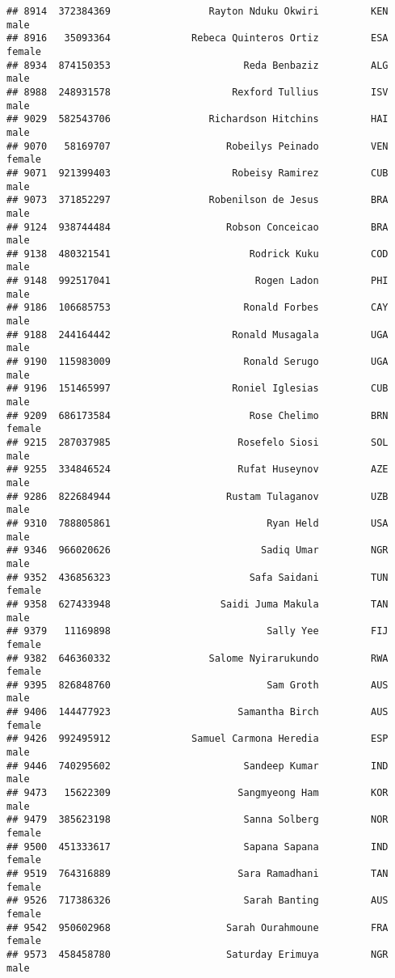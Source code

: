 \documentclass[]{article}
\begin{document}
\begin{verbatim}
## 8914  372384369                 Rayton Nduku Okwiri         KEN   male
## 8916   35093364              Rebeca Quinteros Ortiz         ESA female
## 8934  874150353                       Reda Benbaziz         ALG   male
## 8988  248931578                     Rexford Tullius         ISV   male
## 9029  582543706                 Richardson Hitchins         HAI   male
## 9070   58169707                    Robeilys Peinado         VEN female
## 9071  921399403                     Robeisy Ramirez         CUB   male
## 9073  371852297                 Robenilson de Jesus         BRA   male
## 9124  938744484                    Robson Conceicao         BRA   male
## 9138  480321541                        Rodrick Kuku         COD   male
## 9148  992517041                         Rogen Ladon         PHI   male
## 9186  106685753                       Ronald Forbes         CAY   male
## 9188  244164442                     Ronald Musagala         UGA   male
## 9190  115983009                       Ronald Serugo         UGA   male
## 9196  151465997                     Roniel Iglesias         CUB   male
## 9209  686173584                        Rose Chelimo         BRN female
## 9215  287037985                      Rosefelo Siosi         SOL   male
## 9255  334846524                      Rufat Huseynov         AZE   male
## 9286  822684944                    Rustam Tulaganov         UZB   male
## 9310  788805861                           Ryan Held         USA   male
## 9346  966020626                          Sadiq Umar         NGR   male
## 9352  436856323                        Safa Saidani         TUN female
## 9358  627433948                   Saidi Juma Makula         TAN   male
## 9379   11169898                           Sally Yee         FIJ female
## 9382  646360332                 Salome Nyirarukundo         RWA female
## 9395  826848760                           Sam Groth         AUS   male
## 9406  144477923                      Samantha Birch         AUS female
## 9426  992495912              Samuel Carmona Heredia         ESP   male
## 9446  740295602                       Sandeep Kumar         IND   male
## 9473   15622309                      Sangmyeong Ham         KOR   male
## 9479  385623198                       Sanna Solberg         NOR female
## 9500  451333617                       Sapana Sapana         IND female
## 9519  764316889                      Sara Ramadhani         TAN female
## 9526  717386326                       Sarah Banting         AUS female
## 9542  950602968                    Sarah Ourahmoune         FRA female
## 9573  458458780                    Saturday Erimuya         NGR   male

\end{verbatim}
\end{document}

